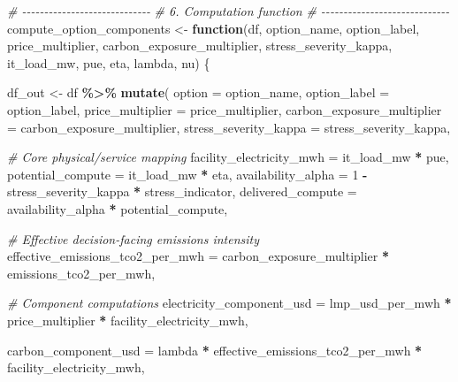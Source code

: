 \documentclass[
]{article}
\newenvironment{Shaded}{\begin{snugshade}}{\end{snugshade}}
\newcommand{\AttributeTok}[1]{\textcolor[rgb]{0.13,0.29,0.53}{#1}}
\newcommand{\CommentTok}[1]{\textcolor[rgb]{0.56,0.35,0.01}{\textit{#1}}}
\newcommand{\ControlFlowTok}[1]{\textcolor[rgb]{0.13,0.29,0.53}{\textbf{#1}}}
\newcommand{\DecValTok}[1]{\textcolor[rgb]{0.00,0.00,0.81}{#1}}
\newcommand{\FunctionTok}[1]{\textcolor[rgb]{0.13,0.29,0.53}{\textbf{#1}}}
\newcommand{\NormalTok}[1]{#1}
\newcommand{\OtherTok}[1]{\textcolor[rgb]{0.56,0.35,0.01}{#1}}
\newcommand{\SpecialCharTok}[1]{\textcolor[rgb]{0.81,0.36,0.00}{\textbf{#1}}}
\begin{document}
\begin{Shaded}
\begin{Highlighting}[]
\CommentTok{\# {-}{-}{-}{-}{-}{-}{-}{-}{-}{-}{-}{-}{-}{-}{-}{-}{-}{-}{-}{-}{-}{-}{-}{-}{-}{-}{-}{-}{-}}
\CommentTok{\# 6. Computation function}
\CommentTok{\# {-}{-}{-}{-}{-}{-}{-}{-}{-}{-}{-}{-}{-}{-}{-}{-}{-}{-}{-}{-}{-}{-}{-}{-}{-}{-}{-}{-}{-}}
\NormalTok{compute\_option\_components }\OtherTok{\textless{}{-}} \ControlFlowTok{function}\NormalTok{(df, option\_name, option\_label,}
\NormalTok{                                      price\_multiplier,}
\NormalTok{                                      carbon\_exposure\_multiplier,}
\NormalTok{                                      stress\_severity\_kappa,}
\NormalTok{                                      it\_load\_mw, pue, eta, lambda, nu) \{}

\NormalTok{  df\_out }\OtherTok{\textless{}{-}}\NormalTok{ df }\SpecialCharTok{\%\textgreater{}\%}
    \FunctionTok{mutate}\NormalTok{(}
      \AttributeTok{option =}\NormalTok{ option\_name,}
      \AttributeTok{option\_label =}\NormalTok{ option\_label,}
      \AttributeTok{price\_multiplier =}\NormalTok{ price\_multiplier,}
      \AttributeTok{carbon\_exposure\_multiplier =}\NormalTok{ carbon\_exposure\_multiplier,}
      \AttributeTok{stress\_severity\_kappa =}\NormalTok{ stress\_severity\_kappa,}

      \CommentTok{\# Core physical/service mapping}
      \AttributeTok{facility\_electricity\_mwh =}\NormalTok{ it\_load\_mw }\SpecialCharTok{*}\NormalTok{ pue,}
      \AttributeTok{potential\_compute =}\NormalTok{ it\_load\_mw }\SpecialCharTok{*}\NormalTok{ eta,}
      \AttributeTok{availability\_alpha =} \DecValTok{1} \SpecialCharTok{{-}}\NormalTok{ stress\_severity\_kappa }\SpecialCharTok{*}\NormalTok{ stress\_indicator,}
      \AttributeTok{delivered\_compute =}\NormalTok{ availability\_alpha }\SpecialCharTok{*}\NormalTok{ potential\_compute,}

      \CommentTok{\# Effective decision{-}facing emissions intensity}
      \AttributeTok{effective\_emissions\_tco2\_per\_mwh =}\NormalTok{ carbon\_exposure\_multiplier }\SpecialCharTok{*}\NormalTok{ emissions\_tco2\_per\_mwh,}

      \CommentTok{\# Component computations}
      \AttributeTok{electricity\_component\_usd =}
\NormalTok{        lmp\_usd\_per\_mwh }\SpecialCharTok{*}\NormalTok{ price\_multiplier }\SpecialCharTok{*}\NormalTok{ facility\_electricity\_mwh,}

      \AttributeTok{carbon\_component\_usd =}
\NormalTok{        lambda }\SpecialCharTok{*}\NormalTok{ effective\_emissions\_tco2\_per\_mwh }\SpecialCharTok{*}\NormalTok{ facility\_electricity\_mwh,}


\end{Highlighting}
\end{Shaded}
\end{document}
